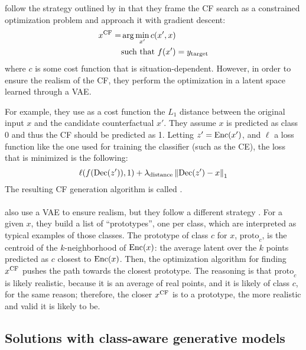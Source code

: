 \documentclass[../main.tex]{subfiles}
\begin{document}
\citeauthor{joshiRealistic2019} follow the strategy outlined by \citeauthor{wachterCounterfactual2017} in that they frame the CF search as a constrained optimization problem and approach it with gradient descent:
\begin{align*}
	x^\text{CF} = & \arg\min_{x'} c(x', x)              \\
	         & \text{such that } f(x') = y_{\mathrm{target}}
\end{align*}
where $c$ is some cost function that is situation-dependent.
However, in order to ensure the realism of the CF, they perform the optimization in a latent space learned through a VAE.

For example, they use as a cost function the $L_1$ distance between the original input $x$ and the candidate counterfactual $x'$.
They assume $x$ is predicted as class 0 and thus the CF should be predicted as 1.
Letting $z'=\operatorname{Enc}(x')$, and $\ell$ a loss function like the one used for training the classifier (such as the CE), the loss that is minimized is the following:
\begin{equation}
	\ell(f(\operatorname{Dec}(z')), 1)
	+ \lambda_\text{distance} \left\lVert\operatorname{Dec}(z') - x\right\rVert_1
\end{equation}
The resulting CF generation algorithm is called \revise{} \cite{joshiRealistic2019}.

\paragraph{}

\citeauthor{vanlooverenInterpretable2021} also use a VAE to ensure realism, but they follow a different strategy \cite{vanlooverenInterpretable2021}.
For a given $x$, they build a list of ``prototypes'', one per class, which are interpreted as typical examples of those classes.
The prototype of class $c$ for $x$, $\text{proto}_c$, is the centroid of the $k$-neighborhood of $\operatorname{Enc}(x)$: the average latent over the $k$ points predicted as $c$ closest to $\operatorname{Enc}(x)$.
Then, the optimization algorithm for finding $x^\text{CF}$ pushes the path towards the closest prototype.
The reasoning is that $\text{proto}_c$ is likely realistic, because it is an average of real points, and it is likely of class $c$, for the same reason; therefore, the closer $x^\text{CF}$ is to a prototype, the more realistic and valid it is likely to be.

\subsection{Solutions with class-aware generative models}
\end{document}
